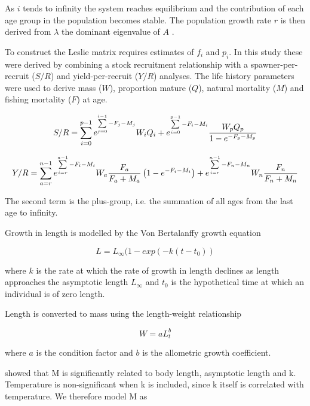 \documentclass[12pt,doublespacing,a4paper]{ouparticle}
\begin{document}
As $i$ tends to infinity the system reaches equilibrium and the contribution of each age group in the population becomes stable. The population growth rate $r$ is then derived from $\lambda$ the dominant eigenvalue of $A$ \citep{caswell1989matrix}.

To construct the Leslie matrix requires estimates of $f_i$ and $p_i$. In this study these were derived by combining a stock recruitment relationship with a spawner-per-recruit ($S/R$) and yield-per-recruit ($Y/R$) analyses. The life history parameters were used to derive mass ($W$), proportion mature ($Q$), natural mortality ($M$) and  fishing mortality ($F$) at age. 

\begin{equation}
S/R=\sum\limits_{i=0}^{p-1} {e^{\sum\limits_{j=0}^{i-1} {-F_j-M_j}}} W_i Q_i + e^{\sum\limits_{i=0}^{p-1} {-F_i-M_i}} \frac{W_p Q_p}{1-e^{-F_p-M_p}}\\
\end{equation} 

\begin{equation}
Y/R=\sum\limits_{a=r}^{n-1} {e^{\sum\limits_{i=r}^{a-1} {-F_i-M_i}}} W_a\frac{F_a}{F_a+M_a}\left(1-e^{-F_i-M_i} \right) + e^{\sum\limits_{i=r}^{n-1} {-F_n-M_n}} W_n\frac{F_n}{F_n+M_n}\\
\end{equation} 

The second term is the plus-group, i.e. the summation of all ages from the last age to infinity. 

Growth in length is modelled by the Von Bertalanffy growth equation \cite{von1957quantitative}

\begin{equation} L = L_\infty(1 - exp(-k(t-t_0)) \end{equation}
         
where $k$ is the rate at which the rate of growth in length declines as length approaches the asymptotic length  $L_\infty$ and $t_{0}$ is the hypothetical time at which an individual is of zero length.

Length is converted to mass using the length-weight relationship 
    
\begin{equation} W = aL_t^b \end{equation}

\noindent where $a$ is the condition factor and $b$ is the allometric growth coefficient.

\cite{gislason2010does} showed that M is significantly related to body length, asymptotic length and k. Temperature is non-significant when k is included, since k itself is correlated with temperature. We therefore model M as
\end{document}
